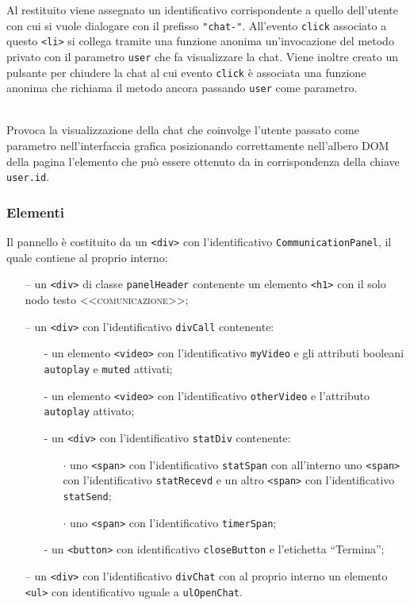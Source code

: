 \begin{description}
   Al  restituito viene assegnato un identificativo corrispondente a quello dell'utente con cui si vuole dialogare con il prefisso \verb'"chat-"'. All'evento \verb'click' associato a questo \verb'<li>' si collega tramite una funzione anonima un'invocazione del metodo privato  con il parametro \verb'user' che fa visualizzare la chat. Viene inoltre creato un pulsante per chiudere la chat al cui evento \verb'click' è associata una funzione anonima che richiama il metodo  ancora passando \verb'user' come parametro.

  \item{}\\
  Provoca la visualizzazione della chat che coinvolge l'utente passato come parametro nell'interfaccia grafica posizionando correttamente nell'albero DOM della pagina l'elemento che può essere ottenuto da  in corrispondenza della chiave \verb'user.id'.

\end{description}

\subsubsection*{Elementi}
Il pannello è costituito da un \verb'<div>' con l'identificativo \verb'CommunicationPanel', il quale contiene al proprio interno:
\begin{itemize}
  \item[--] un \verb'<div>' di classe \verb'panelHeader' contenente un elemento \verb'<h1>' con il solo nodo testo \textsc{<<comunicazione>>};
  \item[--] un \verb'<div>' con l'identificativo \verb'divCall' contenente:
  \begin{itemize}
    \item[-] un elemento \verb'<video>' con l'identificativo \verb'myVideo' e gli attributi booleani \verb'autoplay' e \verb'muted' attivati;
    \item[-] un elemento \verb'<video>' con l'identificativo \verb'otherVideo' e l'attributo \verb'autoplay' attivato;
    \item[-] un \verb'<div>' con l'identificativo \verb'statDiv' contenente:
    \begin{itemize}
      \item[$\cdot$] uno \verb'<span>' con l'identificativo \verb'statSpan' con all'interno uno \verb'<span>' con l'identificativo \verb'statRecevd' e un altro \verb'<span>' con l'identificativo \verb'statSend';
      \item[$\cdot$] uno \verb'<span>' con l'identificativo \verb'timerSpan';
    \end{itemize}
    \item[-] un \verb'<button>' con identificativo \verb'closeButton' e l'etichetta ``Termina'';
  \end{itemize}
  \item[--] un \verb'<div>' con l'identificativo \verb'divChat' con al proprio interno un elemento \verb'<ul>' con identificativo uguale a \verb'ulOpenChat'. 
\end{itemize}


